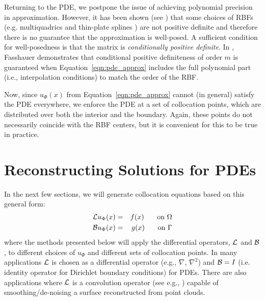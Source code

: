 \documentclass{report}
\begin{document}
{Returning to the PDE, we postpone the issue of  achieving polynomial precision in approximation. However, it has been shown (see \cite{Fasshauer:2007, Iske:2004}) that some choices of RBFs (e.g. multiquadrics and thin-plate splines \cite{Hon:2001}) are not positive definite and therefore there is no guarantee that the approximation is well-posed. A sufficient condition for well-posedness is that the matrix is \emph{conditionally positive definite}. In \cite{Fasshauer:2007}, Fasshauer demonstrates that conditional positive definiteness of order $m$ is guaranteed when Equation~\ref{eqn:pde_approx} includes the full polynomial part (i.e., interpolation conditions) to match the order of the RBF. 

Now, since $u_{\Phi}(x)$ from Equation~\ref{eqn:pde_approx} cannot (in general) satisfy the PDE everywhere, we enforce the PDE at a set of collocation points, which are  distributed over both the interior and the boundary. Again, these points do not necessarily coincide with the RBF centers, but it is convenient for this to be true in practice. 

\section{Reconstructing Solutions for PDEs}
In the next few sections, we will generate collocation equations based on this general form: 
\begin{eqnarray}
\diffop{u_\Phi(x)} &=& f(x) \on{\Interior} \label{eqn:colloc_interior}\\ 
\boundop{u_\Phi(x)} &=& g(x) \on{\Boundary}  \label{eqn:colloc_boundary} %
\end{eqnarray}
where the methods presented below will apply the differential operators, $\mathcal{L}$ and $\mathcal{B}$, to different choices of $u_\Phi$ and different sets of collocation points. In many applications $\mathcal{L}$ is chosen as a differential operator (e.g., $\nabla$, $\nabla^2$) and $\mathcal{B}= I$ (i.e. identity operator for Dirichlet boundary conditions) for PDEs. There are also  applications where $\mathcal{L}$ is a convolution operator (see e.g., \cite{Carr:2001, Carr:2003}) capable of smoothing/de-noising a surface reconstructed from point clouds. 

}
\end{document}
